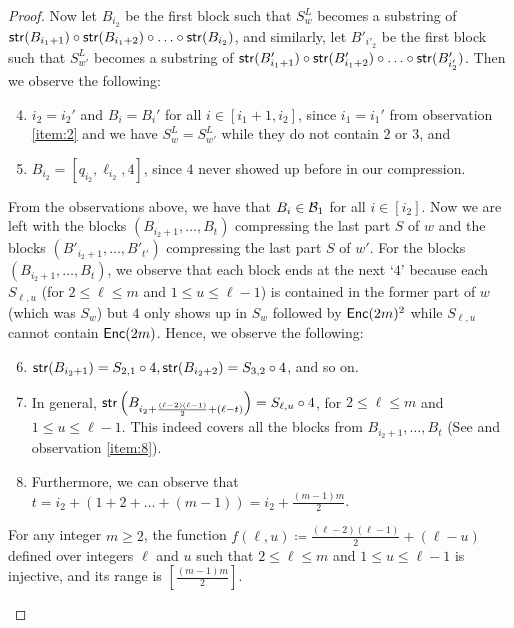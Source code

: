 \begin{proof}
Now let $B_{i_2}$ be the first block such that $S_w^L$ becomes a substring of $\mathsf{str}(B_{i_1+1})\circ\mathsf{str}(B_{i_1+2})\circ\ldots\circ\mathsf{str}(B_{i_2})$, and similarly, let $B'_{i'_2}$ be the first block such that $S_{w'}^L$ becomes a substring of $\mathsf{str}(B'_{i_1+1})\circ\mathsf{str}(B'_{i_1+2})\circ\ldots\circ\mathsf{str}(B'_{i'_2})$. Then we observe the following:
\begin{enumerate}
\setcounter{enumi}{3}
    \item $i_2=i_2'$ and $B_i=B_i'$ for all $i\in[i_1+1,i_2]$, since $i_1=i_1'$ from observation \ref{item:2} and we have $S_w^L=S_{w'}^L$ while they do not contain $2$ or $3$, and
    \item $B_{i_2}=[q_{i_2},\ell_{i_2},4]$, since $4$ never showed up before in our compression.
\end{enumerate}

From the observations above, we have that $B_i\in{\ensuremath{\mathcal{B}}}_1$ for all $i\in[i_2]$. 
Now we are left with the blocks $(B_{i_2+1},\ldots,B_t)$ compressing the last part $S$ of $w$ and the blocks $(B'_{i_2+1},\ldots,B'_{t'})$ compressing the last part $S$ of $w'$. For the blocks $(B_{i_2+1},\ldots,B_t)$, we observe that each block ends at the next `$4$' because each $S_{\ell,u}$ (for $2\leq\ell\leq m$ and $1\leq u\leq \ell-1$) is contained in the former part of $w$ (which was $S_w$) but $4$ only shows up in $S_w$ followed by $\mathsf{Enc}(2m)^2$ while $S_{\ell,u}$ cannot contain $\mathsf{Enc}(2m)$. Hence, we observe the following:
\begin{enumerate}
\setcounter{enumi}{5}
    \item $\mathsf{str}(B_{i_2+1})=S_{2,1}\circ 4,\mathsf{str}(B_{i_2+2})=S_{3,2}\circ 4$,  and so on.
    \item In general, $\mathsf{str}\left(B_{i_2+\frac{(\ell-2)(\ell-1)}{2}+(\ell-t)}\right)=S_{\ell,u}\circ 4$, for $2\leq\ell\leq m$ and $1\leq u\leq \ell-1$. This indeed covers all the blocks from $B_{i_2+1},\ldots,B_t$ (See  and observation \ref{item:8}).
    \item Furthermore, we can observe that $t= i_2 + (1+2+\ldots+(m-1)) = i_2 + \frac{(m-1)m}{2}$.\label{item:8}
\end{enumerate}

\newcommand{\felluinjective}{
For any integer $m\geq 2$, the function $f(\ell,u)\coloneqq\frac{(\ell-2)(\ell-1)}{2}+(\ell-u)$ defined over integers $\ell$ and $u$ such that $2\leq \ell\leq m$ and $1\leq u\leq \ell-1$ is injective, and its range is $[\frac{(m-1)m}{2}]$.
}
\begin{claim}
\felluinjective
\end{claim}


\end{proof}
